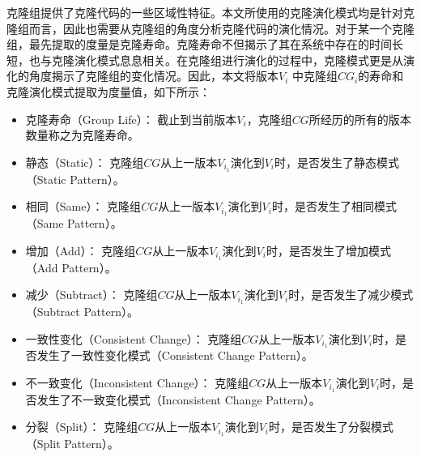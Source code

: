克隆组提供了克隆代码的一些区域性特征。本文所使用的克隆演化模式均是针对克隆组而言，因此也需要从克隆组的角度分析克隆代码的演化情况。对于某一个克隆组，最先提取的度量是克隆寿命。克隆寿命不但揭示了其在系统中存在的时间长短，也与克隆演化模式息息相关。在克隆组进行演化的过程中，克隆模式更是从演化的角度揭示了克隆组的变化情况。因此，本文将版本$V_i $ 中克隆组{$CG_i$}的寿命和克隆演化模式提取为度量值，如下所示：
\begin{itemize}
\item
克隆寿命（Group Life）：
截止到当前版本$V_ i $，克隆组$CG$所经历的所有的版本数量称之为克隆寿命。
\item
静态（Static）：
克隆组$CG$从上一版本$V_ {i_1} $演化到$V_ i $时，是否发生了静态模式（Static Pattern）。
\item
相同（Same）：
克隆组$CG$从上一版本$V_ {i_1} $演化到$V_ i $时，是否发生了相同模式（Same Pattern）。
\item
增加（Add）：
克隆组$CG$从上一版本$V_ {i_1} $演化到$V_ i $时，是否发生了增加模式（Add Pattern）。
\item
减少（Subtract）：
克隆组$CG$从上一版本$V_ {i_1} $演化到$V_ i $时，是否发生了减少模式（Subtract Pattern）。
\item
一致性变化（Consistent Change）：
克隆组$CG$从上一版本$V_ {i_1} $演化到$V_ i $时，是否发生了一致性变化模式（Consistent Change Pattern）。
\item
不一致变化（Inconsistent Change）：
克隆组$CG$从上一版本$V_ {i_1} $演化到$V_ i $时，是否发生了不一致变化模式（Inconsistent Change Pattern）。
\item
分裂（Split）：
克隆组$CG$从上一版本$V_ {i_1} $演化到$V_ i $时，是否发生了分裂模式（Split Pattern）。
\end{itemize}


